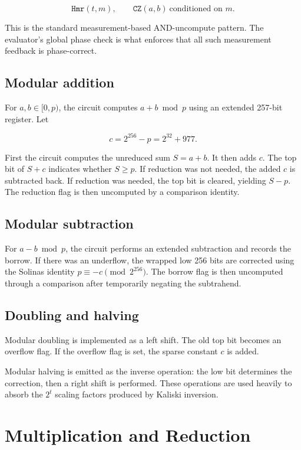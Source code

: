 \documentclass[11pt]{article}
\begin{document}
\[
\texttt{Hmr}(t,m),
\qquad
\texttt{CZ}(a,b)\ \text{conditioned on }m.
\]

This is the standard measurement-based AND-uncompute pattern.  The evaluator's
global phase check is what enforces that all such measurement feedback is
phase-correct.

\subsection{Modular addition}

For \(a,b\in[0,p)\), the circuit computes \(a+b\bmod p\) using an extended
257-bit register.  Let

\[
c=2^{256}-p=2^{32}+977.
\]

First the circuit computes the unreduced sum \(S=a+b\).  It then adds \(c\).
The top bit of \(S+c\) indicates whether \(S\ge p\).  If reduction was not
needed, the added \(c\) is subtracted back.  If reduction was needed, the top
bit is cleared, yielding \(S-p\).  The reduction flag is then uncomputed by a
comparison identity.

\subsection{Modular subtraction}

For \(a-b\bmod p\), the circuit performs an extended subtraction and records the
borrow.  If there was an underflow, the wrapped low 256 bits are corrected using
the Solinas identity \(p\equiv -c \pmod{2^{256}}\).  The borrow flag is then
uncomputed through a comparison after temporarily negating the subtrahend.

\subsection{Doubling and halving}

Modular doubling is implemented as a left shift.  The old top bit becomes an
overflow flag.  If the overflow flag is set, the sparse constant \(c\) is added.

Modular halving is emitted as the inverse operation: the low bit determines the
correction, then a right shift is performed.  These operations are used heavily
to absorb the \(2^t\) scaling factors produced by Kaliski inversion.

\section{Multiplication and Reduction}
\end{document}
